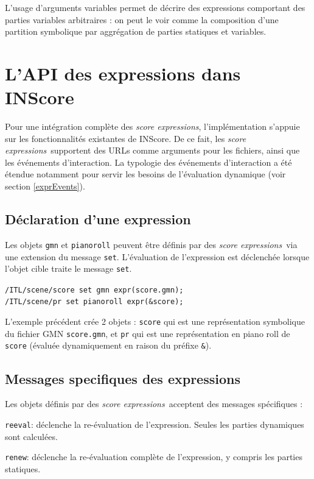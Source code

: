 \documentclass{article}
\newcommand{\OSC}[1]{\texttt{#1}}
\newcommand{\sExprs}{\emph{score expressions}}
\let\olditemize\itemize
\let\oldenditemize\enditemize
\renewenvironment{itemize} 	{\olditemize \setlength{\itemsep}{1mm}}{\oldenditemize}
\newcommand{\sample}	[1]			{\vspace{-0.2em}\begin{center}\colorbox{mygrey}{\begin{minipage}[t]{0.97\columnwidth} {\small \texttt{#1}}\end{minipage}}\end{center}}
\begin{document}
L'usage d'arguments variables permet de décrire des expressions comportant des parties variables arbitraires : on peut le voir comme la composition d'une partition symbolique par aggrégation de parties statiques et variables.

\section{L'API des expressions dans INScore}
\label{exprAPI}

Pour une intégration complète des \sExprs, l'implémentation s'appuie sur les fonctionnalités existantes de INScore. De ce fait, les \sExprs\ supportent des URLs comme arguments pour les fichiers, ainsi que les événements d'interaction. La typologie des événements d'interaction a été étendue notamment pour servir les besoins de l'évaluation dynamique (voir section \ref{exprEvents}).

\subsection{Déclaration d'une expression}
\label{declaringExpr}
Les objets \OSC{gmn} et \OSC{pianoroll} peuvent être définis par des \sExprs\ via une extension du message \OSC{set}.
L'évaluation de l'expression est déclenchée lorsque l'objet cible traite le message \OSC{set}.

\sample{/ITL/scene/score set gmn expr(score.gmn); \\
/ITL/scene/pr set pianoroll expr(\&score);
}

L'exemple précédent crée 2 objets : \OSC{score} qui est une représentation symbolique du fichier GMN \OSC{score.gmn}, et \OSC{pr} qui est une représentation en piano roll de \OSC{score} (évaluée dynamiquement en raison du préfixe  \OSC{\&}).


\subsection{Messages specifiques des expressions}
\label{exprMsgs}
Les objets définis par des \sExprs\ acceptent des messages spécifiques :
\begin{itemize}
\item \OSC{reeval}: déclenche la re-évaluation de l'expression. Seules les parties dynamiques sont calculées.
\item \OSC{renew}: déclenche la re-évaluation complète de l'expression, y compris les parties statiques. 
\end{itemize}
\end{document}
